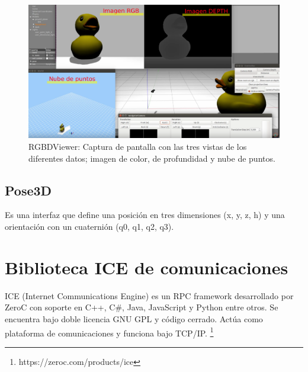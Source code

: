 \begin{figure}[th]
\centering
\includegraphics[scale=0.2]{Figures/rgbdviewer2.png}
\decoRule
\caption[rgbdviewer2]{RGBDViewer: Captura de pantalla con las tres vistas de los diferentes datos; imagen de color, de profundidad y nube de puntos.}
\label{fig:RgbdViewer}
\end{figure}

\subsection{Pose3D}

Es una interfaz que define una posición en tres dimensiones (x, y, z, h) y una orientación con un cuaternión (q0, q1, q2, q3).



\section{Biblioteca ICE de comunicaciones}

ICE (Internet Communications Engine) es un RPC framework desarrollado por ZeroC con soporte en C++, C\#, Java, JavaScript y Python entre otros. Se encuentra bajo doble licencia GNU GPL y código cerrado. Actúa como plataforma de comunicaciones y funciona bajo TCP/IP. \footnote{https://zeroc.com/products/ice}

